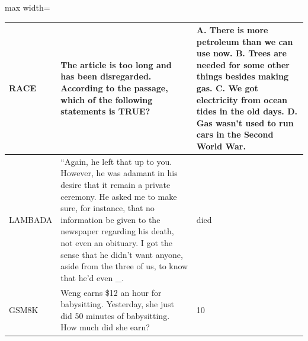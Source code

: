 \documentclass{article} %
\begin{document}
\begin{table}[t!]
\begin{adjustbox}{max width=\textwidth}
\begin{tabular}{lp{7cm}p{9cm}}
        \midrule
        RACE & The article is too long and has been disregarded. \newline According to the passage, which of the following statements is TRUE? & A. There is more petroleum than we can use now. \newline B. Trees are needed for some other things besides making gas. \newline C. We got electricity from ocean tides in the old days. \newline D. Gas wasn't used to run cars in the Second World War. \\
        \midrule
        LAMBADA & “Again, he left that up to you. However, he was adamant in his desire that it remain a private ceremony. He asked me to make sure, for instance, that no information be given to the newspaper regarding his death, not even an obituary. I got the sense that he didn’t want anyone, aside from the three of us, to know that he’d even \_. & died \\
        \midrule
        GSM8K & Weng earns \$12 an hour for babysitting. Yesterday, she just did 50 minutes of babysitting. How much did she earn? & 10 \\
        \bottomrule
    \end{tabular}
    \end{adjustbox}
\end{table}


\end{document}
